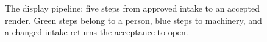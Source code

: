 \begin{figure}[t]
  \centering
  
  \caption{The display pipeline: five steps from approved intake to an accepted
  render. Green steps belong to a person, blue steps to machinery, and a changed
  intake returns the acceptance to open.}
  \label{fig:qpf5-pipeline}
\end{figure}
